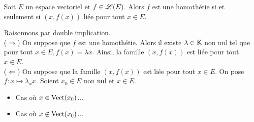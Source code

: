 \begin{tcolorbox}
    Soit $E$ un espace vectoriel et $f \in \mathscr{L}(E)$. Alors $f$ est une homothétie si et seulement si $(x, f(x))$ liée pour tout $x \in E$.
\end{tcolorbox}

\begin{marginfigure}
    
\end{marginfigure}

\begin{preuve}
    Raisonnons par double implication. \\
    ($\Rightarrow$) On suppose que $f$ est une homothétie. Alors il existe $\lambda \in \mathbb{K}$ non nul tel que pour tout $x \in E, f(x) = \lambda x$. Ainsi, la famille $(x, f(x))$ est liée pour tout $x \in E$. \\
    ($\Leftarrow$) On suppose que la famille $(x, f(x))$ est liée pour tout $x \in E$. On pose $\boxed{f:x \mapsto \lambda_x x}$. Soient $x_0 \in E$ non nul et $x \in E$. 
    \begin{itemize}
        \item Cas où $x \in \mathrm{Vect}(x_0)$... 
        \item Cas où $x \not \in \mathrm{Vect}(x_0)$...
    \end{itemize}
\end{preuve}
